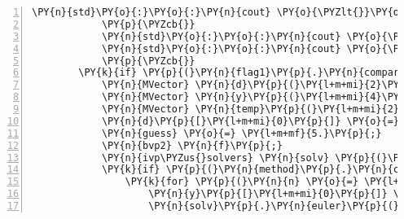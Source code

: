 \begin{Verbatim}[commandchars=\\\{\},numbers=left,firstnumber=1,stepnumber=1]
				\PY{n}{std}\PY{o}{:}\PY{o}{:}\PY{n}{cout} \PY{o}{\PYZlt{}}\PY{o}{\PYZlt{}} \PY{l+s}{\PYZdq{}}\PY{l+s}{A root was not found during the shooting method. Something is probably wrong.}\PY{l+s}{\PYZdq{}} \PY{o}{\PYZlt{}}\PY{o}{\PYZlt{}} \PY{n}{std}\PY{o}{:}\PY{o}{:}\PY{n}{endl}\PY{p}{;}
			\PY{p}{\PYZcb{}}
			\PY{n}{std}\PY{o}{:}\PY{o}{:}\PY{n}{cout} \PY{o}{\PYZlt{}}\PY{o}{\PYZlt{}} \PY{l+s}{\PYZdq{}}\PY{l+s}{y(x): }\PY{l+s}{\PYZdq{}} \PY{o}{\PYZlt{}}\PY{o}{\PYZlt{}} \PY{n}{y}\PY{p}{[}\PY{l+m+mi}{0}\PY{p}{]} \PY{o}{\PYZlt{}}\PY{o}{\PYZlt{}} \PY{n}{std}\PY{o}{:}\PY{o}{:}\PY{n}{endl}\PY{p}{;} \PY{c+c1}{// output the important values}
			\PY{n}{std}\PY{o}{:}\PY{o}{:}\PY{n}{cout} \PY{o}{\PYZlt{}}\PY{o}{\PYZlt{}} \PY{l+s}{\PYZdq{}}\PY{l+s}{y\PYZsq{}(x): }\PY{l+s}{\PYZdq{}} \PY{o}{\PYZlt{}}\PY{o}{\PYZlt{}} \PY{n}{y}\PY{p}{[}\PY{l+m+mi}{1}\PY{p}{]} \PY{o}{\PYZlt{}}\PY{o}{\PYZlt{}} \PY{n}{std}\PY{o}{:}\PY{o}{:}\PY{n}{endl}\PY{p}{;}
			\PY{p}{\PYZcb{}}
		\PY{k}{if} \PY{p}{(}\PY{n}{flag1}\PY{p}{.}\PY{n}{compare}\PY{p}{(}\PY{l+s}{\PYZdq{}}\PY{l+s}{\PYZhy{}b2}\PY{l+s}{\PYZdq{}}\PY{p}{)} \PY{o}{=}\PY{o}{=} \PY{l+m+mi}{0}\PY{p}{)}\PY{p}{\PYZob{}}
			\PY{n}{MVector} \PY{n}{d}\PY{p}{(}\PY{l+m+mi}{2}\PY{p}{)}\PY{p}{;} \PY{c+c1}{// set the boundary conditions}
			\PY{n}{MVector} \PY{n}{y}\PY{p}{(}\PY{l+m+mi}{4}\PY{p}{)}\PY{p}{;} \PY{c+c1}{// to contain the problem}
			\PY{n}{MVector} \PY{n}{temp}\PY{p}{(}\PY{l+m+mi}{2}\PY{p}{)}\PY{p}{;} \PY{c+c1}{// keep the output from shooting}
			\PY{n}{d}\PY{p}{[}\PY{l+m+mi}{0}\PY{p}{]} \PY{o}{=} \PY{l+m+mf}{17.}\PY{p}{;} \PY{n}{d}\PY{p}{[}\PY{l+m+mi}{1}\PY{p}{]} \PY{o}{=} \PY{p}{(}\PY{l+m+mf}{43.}\PY{o}{/}\PY{l+m+mf}{3.}\PY{p}{)}\PY{p}{;}
			\PY{n}{guess} \PY{o}{=} \PY{l+m+mf}{5.}\PY{p}{;}
			\PY{n}{bvp2} \PY{n}{f}\PY{p}{;}
			\PY{n}{ivp\PYZus{}solvers} \PY{n}{solv} \PY{p}{(}\PY{n}{steps}\PY{p}{,} \PY{l+m+mf}{1.}\PY{p}{,} \PY{l+m+mf}{3.}\PY{p}{)}\PY{p}{;}
			\PY{k}{if} \PY{p}{(}\PY{n}{method}\PY{p}{.}\PY{n}{compare}\PY{p}{(}\PY{l+s}{\PYZdq{}}\PY{l+s}{euler}\PY{l+s}{\PYZdq{}}\PY{p}{)} \PY{o}{=}\PY{o}{=} \PY{l+m+mi}{0}\PY{p}{)}\PY{p}{\PYZob{}}
				\PY{k}{for} \PY{p}{(}\PY{n}{n} \PY{o}{=} \PY{l+m+mi}{0}\PY{p}{;} \PY{n}{n} \PY{o}{\PYZlt{}} \PY{l+m+mi}{500}\PY{p}{;} \PY{n}{n}\PY{o}{+}\PY{o}{+}\PY{p}{)}\PY{p}{\PYZob{}}
					\PY{n}{y}\PY{p}{[}\PY{l+m+mi}{0}\PY{p}{]} \PY{o}{=} \PY{l+m+mf}{0.}\PY{p}{;} \PY{n}{y}\PY{p}{[}\PY{l+m+mi}{1}\PY{p}{]} \PY{o}{=} \PY{n}{guess}\PY{p}{;} \PY{n}{y}\PY{p}{[}\PY{l+m+mi}{2}\PY{p}{]} \PY{o}{=} \PY{l+m+mf}{0.}\PY{p}{;} \PY{n}{y}\PY{p}{[}\PY{l+m+mi}{3}\PY{p}{]} \PY{o}{=} \PY{l+m+mf}{1.}\PY{p}{;}
					\PY{n}{solv}\PY{p}{.}\PY{n}{euler}\PY{p}{(}\PY{n}{y}\PY{p}{,} \PY{n}{f}\PY{p}{,} \PY{n}{j}\PY{p}{)}\PY{p}{;}

\end{Verbatim}
